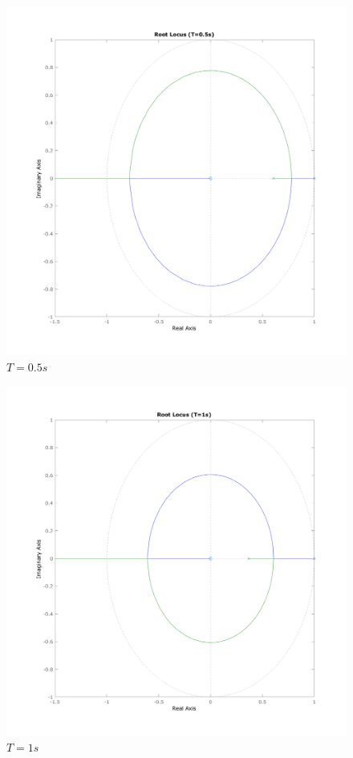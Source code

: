 \documentclass[a4paper,11pt]{article}
\begin{document}
\begin{figure}[H]
    \centering
    \includegraphics[width=0.9\linewidth]{img/exsim3-rlocus-t500ms.png}
    \caption{ $T=0.5s$}
\end{figure}

\begin{figure}[H]
    \centering
    \includegraphics[width=0.9\linewidth]{img/exsim3-rlocus-t1000ms.png}
    \caption{ $T=1s$}
\end{figure}
\end{document}
